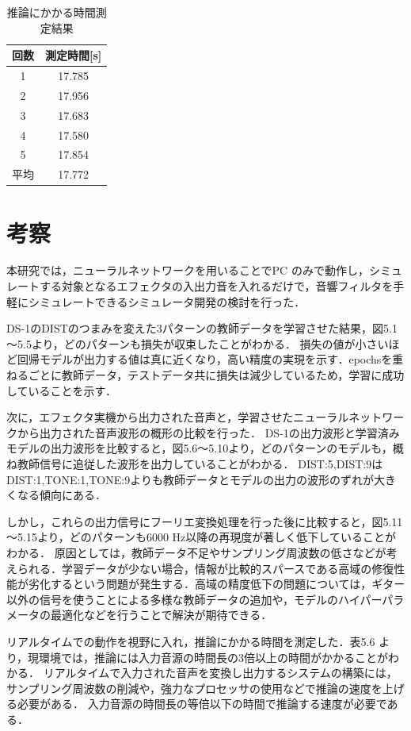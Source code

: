 \documentclass{jreport}		%
\begin{document}
\begin{table}[htbp]
  \begin{center}
  \caption{推論にかかる時間測定結果}
  \begin{tabular}{c|c} \hline
    回数&測定時間[s]\\ \hline
    1&17.785 \\
    2&17.956 \\
    3&17.683 \\
    4&17.580 \\
    5&17.854 \\ \hline
    平均&17.772\\ \hline
  \end{tabular}
  \end{center}
\end{table}

\chapter{考察}
本研究では，ニューラルネットワークを用いることでPC のみで動作し，シミュレートする対象となるエフェクタの入出力音を入れるだけで，音響フィルタを手軽にシミュレートできるシミュレータ開発の検討を行った．

DS-1のDISTのつまみを変えた3パターンの教師データを学習させた結果，図5.1～5.5より，どのパターンも損失が収束したことがわかる．
損失の値が小さいほど回帰モデルが出力する値は真に近くなり，高い精度の実現を示す．epochsを重ねるごとに教師データ，テストデータ共に損失は減少しているため，学習に成功していることを示す．

次に，エフェクタ実機から出力された音声と，学習させたニューラルネットワークから出力された音声波形の概形の比較を行った．
DS-1の出力波形と学習済みモデルの出力波形を比較すると，図5.6～5.10より，どのパターンのモデルも，概ね教師信号に追従した波形を出力していることがわかる．
DIST:5,DIST:9はDIST:1,TONE:1,TONE:9よりも教師データとモデルの出力の波形のずれが大きくなる傾向にある．

しかし，これらの出力信号にフーリエ変換処理を行った後に比較すると，図5.11～5.15より，どのパターンも6000 Hz以降の再現度が著しく低下していることがわかる．
原因としては，教師データ不足やサンプリング周波数の低さなどが考えられる．学習データが少ない場合，情報が比較的スパースである高域の修復性能が劣化するという問題が発生する．高域の精度低下の問題については，ギター以外の信号を使うことによる多様な教師データの追加や，モデルのハイパーパラメータの最適化などを行うことで解決が期待できる．

リアルタイムでの動作を視野に入れ，推論にかかる時間を測定した．表5.6 より，現環境では，推論には入力音源の時間長の3倍以上の時間がかかることがわかる．
リアルタイムで入力された音声を変換し出力するシステムの構築には，サンプリング周波数の削減や，強力なプロセッサの使用などで推論の速度を上げる必要がある．
入力音源の時間長の等倍以下の時間で推論する速度が必要である．
\end{document}
